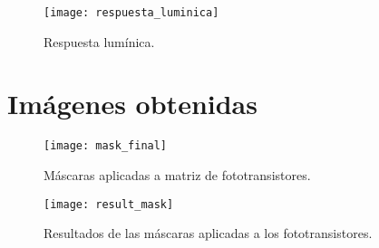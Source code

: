             \begin{figure}[hbtp]
                \centering
                \texttt{[image: respuesta\_luminica]}
                \caption{Respuesta lumínica.}
                \label{fig:respuesta_luminica}
            \end{figure}            
            
            
\newpage
\section{Imágenes obtenidas}

            \begin{figure}[hbtp]
                \centering
                \texttt{[image: mask\_final]}
                \caption{Máscaras aplicadas a matriz de fototransistores.}
                \label{fig:mask_final}
            \end{figure}  

            \begin{figure}[hbtp]
                \centering
                \texttt{[image: result\_mask]}
                \caption{Resultados de las máscaras aplicadas a los fototransistores.}
                \label{fig:result_mask}
            \end{figure}
